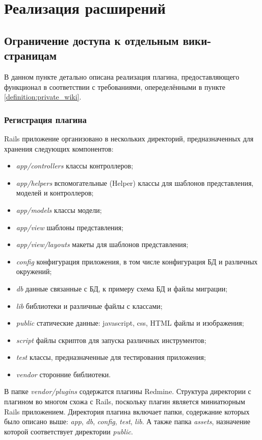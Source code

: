 \lstset{language=Ruby}

\chapter{Реализация расширений}
\label{section:implementation}

\section{Ограничение доступа к отдельным вики-страницам}
\label{section:private_wiki}
В данном пункте детально описана реализация плагина, предоставляющего
функционал в соответствии с требованиями, опеределёнными в пункте
\ref{definition:private_wiki}.

\subsection{Регистрация плагина}
 
Rails приложение организовано в нескольких директорий, предназначенных для
хранения следующих компонентов:

\begin{itemize}
\item \textit{app/controllers} классы контроллеров;
\item \textit{app/helpers} вспомогательные (Helper) классы для шаблонов
представления, моделей и контроллеров;
\item \textit{app/models} классы модели;
\item \textit{app/view} шаблоны представления;
\item \textit{app/view/layouts} макеты для шаблонов представления;
\item \textit{config} конфигурация приложения, в том числе конфигурация БД и
различных окружений;
\item \textit{db} данные связанные с БД, к примеру схема БД и файлы миграции;
\item \textit{lib} библиотеки и различные файлы с классами;
\item \textit{public} статические данные: javascript, css, HTML файлы и
изображения;
\item \textit{script} файлы скриптов для запуска различных инструментов;
\item \textit{test} классы, предназначенные для тестирования приложения;
\item \textit{vendor} сторонние библиотеки.
\end{itemize}
В папке \textit{vendor/plugins} содержатся плагины Redmine. Структура
директории с плагином во многом схожа с Rails, поскольку плагин является
миниатюрным Rails приложением. Директория плагина включает папки, содержание
которых было описано выше: \textit{app}, \textit{db}, \textit{config},
\textit{test}, \textit{lib}.
А также папка \textit{assets}, назначение которой соответствует директории
\textit{public}.

